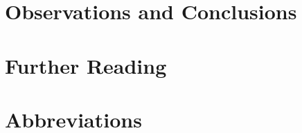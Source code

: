\documentclass[english]{report}
\begin{document}


\chapter{Observations and Conclusions}



\chapter{Further Reading}



\appendix

%


\chapter{Abbreviations}

\printacronyms[include-classes=abbrev,name=]

\newpage


%




\end{document}
